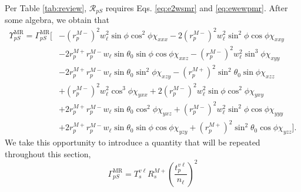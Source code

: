 Per Table \ref{tab:review}, $\mathcal{R}_{pS}$ requires Eqs. \eqref{eq:e2wsmr}
and \eqref{eq:ewewpmr}. After some algebra, we obtain that
\begin{equation}\label{eq:rpsfullmr}
\begin{split}
\Upsilon^{\mathrm{MR}}_{pS}
= 
\Gamma^{\mathrm{MR}}_{pS}
\big[
&- \left(r^{M-}_{p}\right)^{2}w^{2}_{\ell}\sin\phi\cos^{2}\phi\chi_{xxx}
 - 2\left(r^{M-}_{p}\right)^{2}w^{2}_{\ell}\sin^{2}\phi\cos\phi\chi_{xxy}\\
&- 2r^{M+}_{p}r^{M-}_{p}w_{\ell}\sin\theta_{0}\sin\phi\cos\phi\chi_{xxz}
 - \left(r^{M-}_{p}\right)^{2}w^{2}_{\ell}\sin^{3}\phi\chi_{xyy}\\
&- 2r^{M+}_{p}r^{M-}_{p}w_{\ell}\sin\theta_{0}\sin^{2}\phi\chi_{xzy}
 - \left(r^{M+}_{p}\right)^{2}\sin^{2}\theta_{0}\sin\phi\chi_{xzz}\\
&+ \left(r^{M-}_{p}\right)^{2}w^{2}_{\ell}\cos^{3}\phi\chi_{yxx}
 + 2\left(r^{M-}_{p}\right)^{2}w^{2}_{\ell}\sin\phi\cos^{2}\phi\chi_{yxy}\\
&+ 2r^{M+}_{p}r^{M-}_{p}w_{\ell}\sin\theta_{0}\cos^{2}\phi\chi_{yxz}
 + \left(r^{M-}_{p}\right)^{2}w^{2}_{\ell}\sin^{2}\phi\cos\phi\chi_{yyy}\\
&+ 2r^{M+}_{p}r^{M-}_{p}w_{\ell}\sin\theta_{0}\sin\phi\cos\phi\chi_{yzy}
 + \left(r^{M+}_{p}\right)^{2}\sin^{2}\theta_{0}\cos\phi\chi_{yzz}
\big].
\end{split}
\end{equation}
We take this opportunity to introduce a quantity that will be repeated
throughout this section,
\begin{equation}\label{eq:gammapsmr}
\Gamma^{\mathrm{MR}}_{pS} =
T_{s}^{v\ell}R^{M+}_{s}
\left(\frac{t^{v\ell}_{p}}{n_{\ell}}\right)^{2}
\end{equation}

